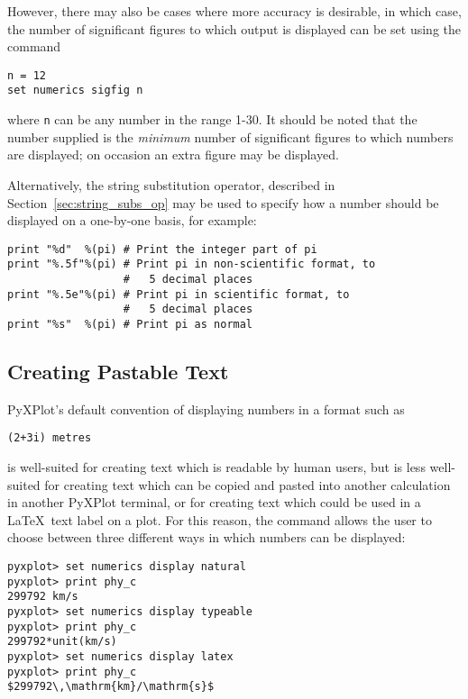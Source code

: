 However, there may also be cases where more accuracy is desirable, in which
case, the number of significant figures to which output is displayed can be set
using the command

\begin{verbatim}
n = 12
set numerics sigfig n
\end{verbatim}

\noindent where {\tt n} can be any number in the range 1-30. It should be noted
that the number supplied is the {\it minimum} number of significant figures to
which numbers are displayed; on occasion an extra figure may be displayed.

Alternatively, the string substitution operator, described in
Section~\ref{sec:string_subs_op} may be used to specify how a number should be
displayed on a one-by-one basis, for example:

\begin{verbatim}
print "%d"  %(pi) # Print the integer part of pi
print "%.5f"%(pi) # Print pi in non-scientific format, to
                  #   5 decimal places
print "%.5e"%(pi) # Print pi in scientific format, to
                  #   5 decimal places
print "%s"  %(pi) # Print pi as normal
\end{verbatim}

\subsection{Creating Pastable Text}
\label{sec:pastable}

PyXPlot's default convention of displaying numbers in a format such as

\begin{verbatim}
(2+3i) metres
\end{verbatim}

is well-suited for creating text which is readable by human users, but is less
well-suited for creating text which can be copied and pasted into another
calculation in another PyXPlot terminal, or for creating text which could be
used in a \LaTeX\ text label on a plot. For this reason, the  command allows the user to choose between three different
ways in which numbers can be displayed:

\begin{verbatim}
pyxplot> set numerics display natural
pyxplot> print phy_c
299792 km/s
pyxplot> set numerics display typeable
pyxplot> print phy_c
299792*unit(km/s)
pyxplot> set numerics display latex
pyxplot> print phy_c
$299792\,\mathrm{km}/\mathrm{s}$
\end{verbatim}


